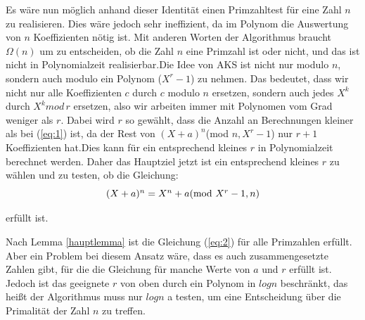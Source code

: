 \documentclass[12pt,oneside]{article}
\theoremstyle{remark}
\theoremstyle{definition}
\begin{document}
\begin{flushleft}
Es wäre nun möglich anhand dieser Identität einen Primzahltest für eine Zahl $n$ zu realisieren. Dies wäre jedoch sehr ineffizient, da im Polynom die Auswertung von $n$ Koeffizienten nötig ist. Mit anderen Worten der Algorithmus braucht $\Omega(n)$ um zu entscheiden, ob die Zahl $n$ eine Primzahl ist oder nicht, und das ist nicht in Polynomialzeit realisierbar.\newline\newline Die Idee von AKS ist nicht nur modulo $n$, sondern auch modulo ein Polynom ($X^r -1$) zu nehmen. Das bedeutet, dass wir nicht nur alle Koeffizienten $c$ durch $c$ modulo $n$ ersetzen, sondern auch jedes $X^k$ durch $X^k mod \, r$ ersetzen, also wir arbeiten immer mit Polynomen vom Grad weniger als $r$. Dabei wird $r$ so gewählt, dass die Anzahl an Berechnungen kleiner als bei (\ref{eq:1}) ist, da der Rest von $(X + a)^n$(mod $ n, X^r - 1$) nur $ r + 1$ Koeffizienten hat.\newline Dies kann für ein entsprechend kleines $r$ in Polynomialzeit berechnet werden. Daher das Hauptziel jetzt ist ein entsprechend kleines $r$ zu wählen und zu testen, ob die Gleichung:\newline\newline
\begin{equation}\label{eq:2}
    \centerline{$(X + a)^n = X^n + a $(mod $X^r - 1, n$)}
\end{equation}

erfüllt ist.\newline

Nach Lemma \ref{hauptlemma} ist die Gleichung (\ref{eq:2}) für alle Primzahlen erfüllt. Aber ein Problem bei diesem Ansatz wäre, dass es auch zusammengesetzte Zahlen gibt, für die die Gleichung für manche Werte von $a$ und $r$ erfüllt ist. Jedoch ist das geeignete $r$ von oben durch ein Polynom in $log n$ beschränkt, das heißt der Algorithmus muss nur $log n$ a testen, um eine Entscheidung über die Primalität der Zahl $n$ zu treffen.

\end{flushleft}
\end{document}
